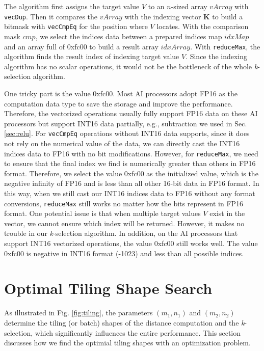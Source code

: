 \documentclass[12pt]{extbook}
\begin{document}
The algorithm first assigns the target value $V$ to an $n$-sized array $vArray$ with \verb|vecDup|. Then it compares the $vArray$ with the indexing vector \textbf{K} to build a bitmask with \verb|vecCmpEq| for the position where $V$ locates. With the comparison mask $cmp$, we select the indices data between a prepared indices map $idxMap$ and an array full of 0xfc00 to build a result array $idxArray$. With \verb|reduceMax|, the algorithm finds the result index of indexing target value $V$. Since the indexing algorithm has no scalar operations, it would not be the bottleneck of the whole \textit{k}-selection algorithm.

One tricky part is the value 0xfc00. Most AI processors \cite{DBLP:journals/micro/ChoquetteGGSK21, DBLP:conf/isca/LiuDTHLXCC16, DBLP:conf/isca/JouppiYPPABBBBB17, DBLP:conf/hotchips/LiaoTXZ19} adopt FP16 as the computation data type to save the storage and improve the performance. Therefore, the vectorized operations usually fully support FP16 data on these AI processors but support INT16 data partially, e.g., subtraction we used in Sec. \ref{sec:relu}. For \verb|vecCmpEq| operations without INT16 data supports, since it does not rely on the numerical value of the data, we can directly cast the INT16 indices data to FP16 with no bit modifications. However, for \verb|reduceMax|, we need to ensure that the final index we find is numerically greater than others in FP16 format. Therefore, we select the value 0xfc00 as the initialized value, which is the negative infinity of FP16 and is less than all other 16-bit data in FP16 format. In this way, when we still cast our INT16 indices data to FP16 without any format conversions, \verb|reduceMax| still works no matter how the bits represent in FP16 format. One potential issue is that when multiple target values $V$ exist in the vector, we cannot ensure which index will be returned. However, it makes no trouble in our \textit{k}-selection algorithm. In addition, on the AI processors that support INT16 vectorized operations, the value 0xfc00 still works well. The value 0xfc00 is negative in INT16 format (-1023) and less than all possible indices.

\section{Optimal Tiling Shape Search \label{sec:tile}}

As illustrated in Fig. \ref{fig:tiling}, the parameters $(m_1, n_1)$ and $(m_2, n_2)$ determine the tiling (or batch) shapes of the distance computation and the \textit{k}-selection, which significantly influences the entire performance. This section discusses how we find the optimial tiling shapes with an optimization problem.
\end{document}
